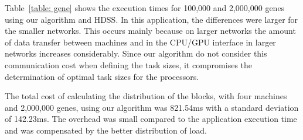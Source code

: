 \documentclass[journal]{IEEEtran}
\begin{document}


Table~\ref{table: gene} shows the execution times for 100,000 and 2,000,000
genes using our algorithm and HDSS. In this application, the differences were
larger for the smaller networks. This occurs mainly because on larger networks
the amount of data transfer between machines and in the CPU/GPU interface in
larger networks increases considerably. Since our algorithm do not consider this
communication cost when defining the task sizes, it compromises the
determination of optimal task sizes for the processors.

The total cost of calculating the distribution of the blocks, with four machines
and 2,000,000 genes, using our algorithm was 821.54ms with a standard deviation
of 142.23ms. The overhead was small compared to the application execution time
and was compensated by the better distribution of load.
\end{document}
